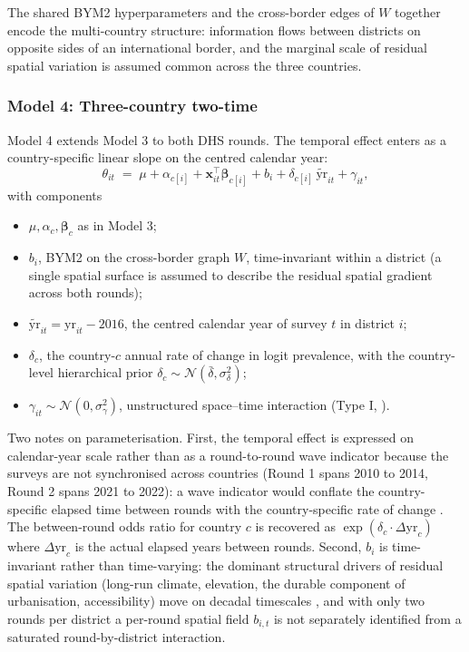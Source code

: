 \documentclass{article}
\begin{document}
The shared BYM2 hyperparameters and the cross-border edges of \(W\)
together encode the multi-country structure: information flows between
districts on opposite sides of an international border, and the marginal
scale of residual spatial variation is assumed common across the three
countries.

\subsubsection{Model 4: Three-country
two-time}\label{model-4-three-country-two-time}

\label{sec:m4}

Model 4 extends Model 3 to both DHS rounds. The temporal effect enters
as a country-specific linear slope on the centred calendar year:
\begin{equation}
\theta_{it} \;=\; \mu + \alpha_{c[i]} + \mathbf{x}_{it}^{\top} \bm{\beta}_{c[i]} + b_i + \delta_{c[i]} \, \widetilde{\text{yr}}_{it} + \gamma_{it},
\label{eq:m4}
\end{equation} with components

\begin{itemize}
\item $\mu, \alpha_c, \bm{\beta}_c$ as in Model 3;
\item $b_i$, BYM2 on the cross-border graph $W$, time-invariant within a district (a single spatial surface is assumed to describe the residual spatial gradient across both rounds);
\item $\widetilde{\text{yr}}_{it} = \text{yr}_{it} - 2016$, the centred calendar year of survey $t$ in district $i$;
\item $\delta_c$, the country-$c$ annual rate of change in logit prevalence, with the country-level hierarchical prior $\delta_c \sim \mathcal{N}(\bar{\delta}, \sigma_\delta^{2})$;
\item $\gamma_{it} \sim \mathcal{N}(0, \sigma_\gamma^{2})$, unstructured space–time interaction (Type I, \citep{knorrheld2000}).
\end{itemize}

Two notes on parameterisation. First, the temporal effect is expressed
on calendar-year scale rather than as a round-to-round wave indicator
because the surveys are not synchronised across countries (Round 1 spans
2010 to 2014, Round 2 spans 2021 to 2022): a wave indicator would
conflate the country-specific elapsed time between rounds with the
country-specific rate of change \citep{wakefield2020}. The between-round
odds ratio for country \(c\) is recovered as
\(\exp(\delta_c \cdot \Delta \text{yr}_c)\) where \(\Delta \text{yr}_c\)
is the actual elapsed years between rounds. Second, \(b_i\) is
time-invariant rather than time-varying: the dominant structural drivers
of residual spatial variation (long-run climate, elevation, the durable
component of urbanisation, accessibility) move on decadal timescales
\citep{bhatt2015, weiss2020}, and with only two rounds per district a
per-round spatial field \(b_{i, t}\) is not separately identified from a
saturated round-by-district interaction.
\end{document}
